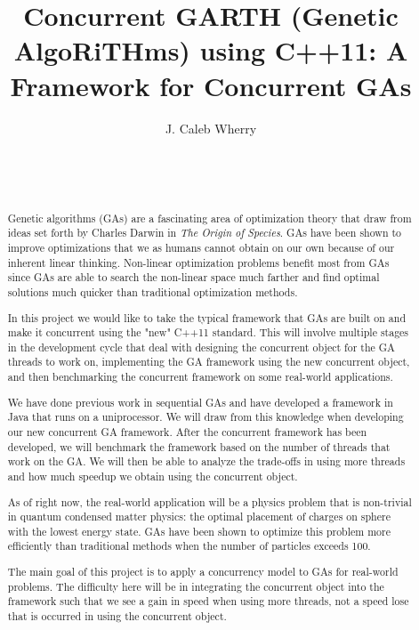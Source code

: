 \documentclass{acm_proc_article-sp}
\begin{document}
\title{
Concurrent GARTH (Genetic AlgoRiTHms) using C++11: A Framework for Concurrent GAs
}


\author{
\alignauthor
J. Caleb Wherry \\
   \\
   \\
   \\
}

\maketitle


%
%
\begin{abstract}
Genetic algorithms (GAs) are a fascinating area of optimization theory that draw from ideas set forth by Charles Darwin in \emph{The Origin of Species}. GAs have been shown to improve optimizations that we as humans cannot obtain on our own because of our inherent linear thinking. Non-linear optimization problems benefit most from GAs since GAs are able to search the non-linear space much farther and find optimal solutions much quicker than traditional optimization methods.

In this project we would like to take the typical framework that GAs are built on and make it concurrent using the "new" C++11 standard. This will involve multiple stages in the development cycle that deal with designing the concurrent object for the GA threads to work on, implementing the GA framework using the new concurrent object, and then benchmarking the concurrent framework on some real-world applications.

We have done previous work in sequential GAs and have developed a framework in Java that runs on a uniprocessor. We will draw from this knowledge when developing our new concurrent GA framework. After the concurrent framework has been developed, we will benchmark the framework based on the number of threads that work on the GA. We will then be able to analyze the trade-offs in using more threads and how much speedup we obtain using the concurrent object.

As of right now, the real-world application will be a physics problem that is non-trivial in quantum condensed matter physics: the optimal placement of charges on sphere with the lowest energy state\cite{pang:compphys}. GAs have been shown to optimize this problem more efficiently than traditional methods when the number of particles exceeds 100.

The main goal of this project is to apply a concurrency model to GAs for real-world problems. The difficulty here will be in integrating the concurrent object into the framework such that we see a gain in speed when using more threads, not a speed lose that is occurred in using the concurrent object.
\end{abstract}
\end{document}
